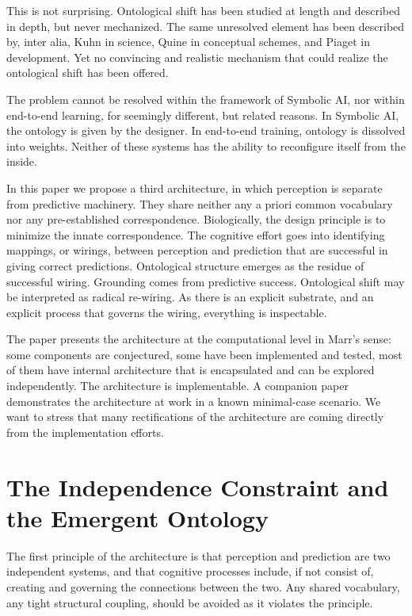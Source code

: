 \documentclass[12pt, a4paper]{article}
\begin{document}
This is not surprising. Ontological shift has been studied at length
and described in depth, but never mechanized. The same unresolved
element has been described by, inter alia, Kuhn in science, Quine in
conceptual schemes, and Piaget in development. Yet no convincing and
realistic mechanism that could realize the ontological shift has been
offered.

The problem cannot be resolved within the framework of Symbolic AI, nor
within end-to-end learning, for seemingly different, but related reasons.
In Symbolic AI, the ontology is given by the designer. In end-to-end
training, ontology is dissolved into weights. Neither of these systems
has the ability to reconfigure itself from the inside.

In this paper we propose a third architecture, in which perception is
separate from predictive machinery. They share neither any a priori
common vocabulary nor any pre-established correspondence. Biologically,
the design principle is to minimize the innate correspondence. The
cognitive effort goes into identifying mappings, or wirings, between
perception and prediction that are successful in giving correct
predictions. Ontological structure emerges as the residue of successful
wiring. Grounding comes from predictive success. Ontological shift may
be interpreted as radical re-wiring. As there is an explicit substrate,
and an explicit process that governs the wiring, everything is
inspectable.

The paper presents the architecture at the computational level in
Marr's sense: some components are conjectured, some have been
implemented and tested, most of them have internal architecture that is
encapsulated and can be explored independently. The architecture is
implementable. A companion paper \cite{companion} demonstrates the architecture at work
in a known minimal-case scenario. We want to stress that many
rectifications of the architecture are coming directly from the
implementation efforts.

\section{The Independence Constraint and the Emergent Ontology}

The first principle of the architecture is that perception and prediction
are two independent systems, and that cognitive processes include, if
not consist of, creating and governing the connections between the two.
Any shared vocabulary, any tight structural coupling, should be avoided
as it violates the principle.
\end{document}
